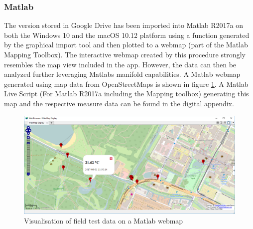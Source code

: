 \subsubsection{Matlab}
The version stored in Google Drive has been imported into Matlab R2017a on both the Windows 10 and the macOS 10.12 platform using a function generated by the graphical import tool and then plotted to a webmap (part of the Matlab Mapping Toolbox). The interactive webmap created by this procedure strongly resembles the map view included in the app. However, the data can then be analyzed further leveraging Matlabs manifold capabilities. A Matlab webmap generated using map data from OpenStreetMaps is shown in figure \ref{fig:matlab_webmap}. A Matlab Live Script (For Matlab R2017a including the Mapping toolbox) generating this map and the respective measure data can be found in the digital appendix.
\begin{figure}[ht]
\centering
\includegraphics[width=1.0\textwidth]{src/matlab_webmap.png}
\caption{Visualisation of field test data on a Matlab webmap}
\label{fig:matlab_webmap}
\end{figure}
